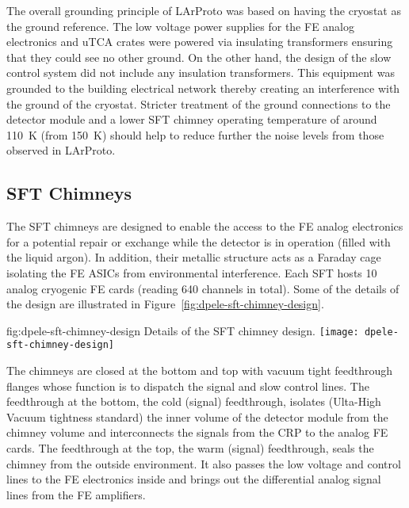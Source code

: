 The overall grounding principle of LArProto was based on having the cryostat as the ground reference. The low voltage power supplies for the FE analog electronics and uTCA crates were powered via insulating transformers ensuring that they could see no other ground. On the other hand, the design of the slow control system did not include any insulation transformers. This equipment was grounded to the building electrical network thereby creating an interference with the ground of the cryostat. Stricter treatment of the ground connections to the detector module  and a lower SFT chimney operating temperature of around \SI{110}{\kelvin} (from \SI{150}{\kelvin}) should help to reduce further the noise levels from those observed in LArProto.


\subsection{SFT Chimneys}
\label{sec:fddp-tpc-elec-design-sft}

The SFT chimneys are designed to enable the access to the FE analog electronics for a potential repair or exchange while the detector is in operation (filled with the liquid argon). In addition, their metallic structure acts as a Faraday cage isolating the FE ASICs from environmental interference.  Each SFT hosts \num{10} analog cryogenic FE cards (reading \num{640} channels in total).  Some of the details of the design are illustrated in Figure~\ref{fig:dpele-sft-chimney-design}. 

\begin{dunefigure}{fig:dpele-sft-chimney-design}
{Details of the SFT chimney design.}
\texttt{[image: dpele-sft-chimney-design]}
\end{dunefigure}

The chimneys are closed at the bottom and top with vacuum tight feedthrough flanges whose function is to dispatch the signal and slow control lines. The feedthrough at the bottom, the cold (signal) feedthrough, isolates (Ulta-High Vacuum tightness standard) the inner volume of the detector module from the chimney volume and interconnects the signals from the CRP to the analog FE cards. The feedthrough at the top, the warm (signal) feedthrough, seals the chimney from the outside environment. It also passes the low voltage and control lines to the FE electronics inside and brings out the differential analog signal lines from the FE amplifiers. 

